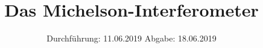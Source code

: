 

\subject{V401}
\title{Das Michelson-Interferometer}
\date{%
  Durchführung: 11.06.2019
  \hspace{3em}
  Abgabe: 18.06.2019
}



\maketitle
\thispagestyle{empty}
\tableofcontents
\newpage






\printbibliography{}


